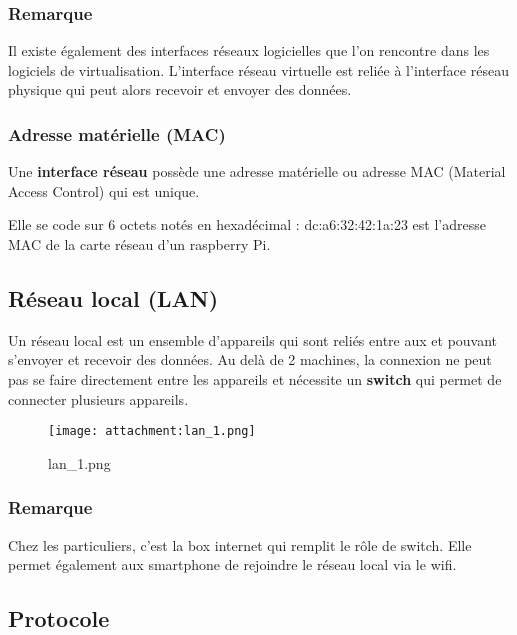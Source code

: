 \documentclass[11pt]{article}
\begin{document}
    \hypertarget{remarque}{%
\subsubsection{Remarque}\label{remarque}}

Il existe également des interfaces réseaux logicielles que l'on
rencontre dans les logiciels de virtualisation. L'interface réseau
virtuelle est reliée à l'interface réseau physique qui peut alors
recevoir et envoyer des données.

\hypertarget{adresse-matuxe9rielle-mac}{%
\subsubsection{Adresse matérielle
(MAC)}\label{adresse-matuxe9rielle-mac}}

Une \textbf{interface réseau} possède une adresse matérielle ou adresse
MAC (Material Access Control) qui est unique.

Elle se code sur 6 octets notés en hexadécimal : dc:a6:32:42:1a:23 est
l'adresse MAC de la carte réseau d'un raspberry Pi.

    \hypertarget{ruxe9seau-local-lan}{%
\subsection{Réseau local (LAN)}\label{ruxe9seau-local-lan}}

Un réseau local est un ensemble d'appareils qui sont reliés entre aux et
pouvant s'envoyer et recevoir des données. Au delà de 2 machines, la
connexion ne peut pas se faire directement entre les appareils et
nécessite un \textbf{switch} qui permet de connecter plusieurs
appareils.

    \begin{figure}
\centering
\texttt{[image: attachment:lan\_1.png]}
\caption{lan\_1.png}
\end{figure}

    \hypertarget{remarque}{%
\subsubsection{Remarque}\label{remarque}}

Chez les particuliers, c'est la box internet qui remplit le rôle de
switch. Elle permet également aux smartphone de rejoindre le réseau
local via le wifi.

\hypertarget{protocole}{%
\subsection{Protocole}\label{protocole}}
\end{document}
